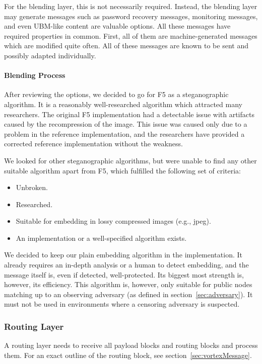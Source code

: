 For the blending layer, this is not necessarily required. Instead, the blending layer may generate messages such as password recovery messages, monitoring messages, and even UBM-like content are valuable options. All these messages have required properties in common. First, all of them are machine-generated messages which are modified quite often. All of these messages are known to be sent and possibly adapted individually.

\paragraph{Blending Process}
After reviewing the options, we decided to go for F5\cite{f5} as a steganographic algorithm. It is a reasonably well-researched algorithm which attracted many researchers. The original F5 implementation had a detectable issue with artifacts\cite{F5broken} caused by the recompression of the image. This issue was caused only due to a problem in the reference implementation, and the researchers have provided a corrected reference implementation without the weakness.

We looked for other steganographic algorithms, but were unable to find any other suitable algorithm apart from F5, which fulfilled the following set of criteria:
\begin{itemize}
	\item Unbroken.
	\item Researched.
	\item Suitable for embedding in lossy compressed images (e.g., jpeg).
	\item An implementation or a well-specified algorithm exists.
\end{itemize}

We decided to keep our plain embedding algorithm in the implementation. It already requires an in-depth analysis or a human to detect embedding, and the message itself is, even if detected, well-protected. Its biggest most strength is, however, its efficiency. This algorithm is, however, only suitable for public nodes matching up to an observing adversary (as defined in section~\ref{sec:adversary}). It must not be used in environments where a censoring adversary is suspected.

\subsubsection{Routing Layer\label{sec:routingLayer}}
A routing layer needs to receive all payload blocks and routing blocks and process them. For an exact outline of the routing block, see section~\ref{sec:vortexMessage}.


